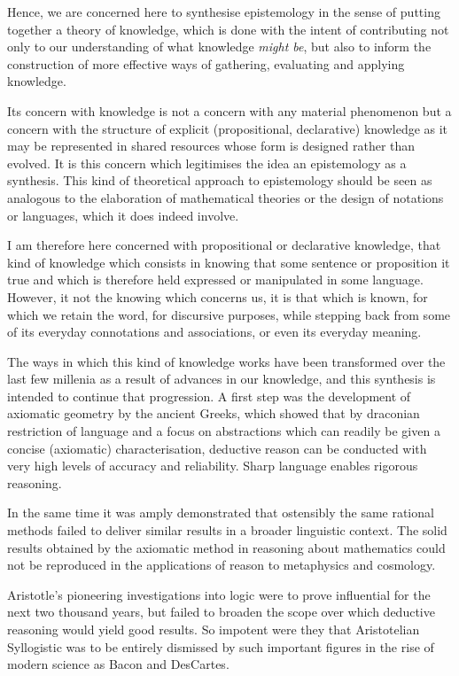\documentclass[10pt,titlepage]{book}
\begin{document}
Hence, we are concerned here to synthesise epistemology in the sense of putting together a theory of knowledge, which is done with the intent of contributing not only to our understanding of what knowledge \emph{might be}, but also to inform the construction of more effective ways of gathering, evaluating and applying knowledge.



Its concern with knowledge is not a concern with any material phenomenon but a concern with the structure of explicit (propositional, declarative) knowledge as it may be represented in shared resources whose form is designed rather than evolved.
It is this concern which legitimises the idea an epistemology as a synthesis.
This kind of theoretical approach to epistemology should be seen as analogous to the elaboration of mathematical theories or the design of notations or languages, which it does indeed involve.

I am therefore here concerned with propositional or declarative knowledge, that kind of knowledge which consists in knowing that some sentence or proposition it true and which is therefore held expressed or manipulated in some language.
However, it not the knowing which concerns us, it is that which is known, for which we retain the word, for discursive purposes, while stepping back from some of its everyday connotations and associations, or even its everyday meaning.

The ways in which this kind of knowledge works have been transformed over the last few millenia as a result of advances in our knowledge, and this synthesis is intended to continue that progression.
A first step was the development of axiomatic geometry by the ancient Greeks, which showed that by draconian restriction of language and a focus on abstractions which can readily be given a concise (axiomatic) characterisation, deductive reason can be conducted with very high levels of accuracy and reliability.
Sharp language enables rigorous reasoning.

In the same time it was amply demonstrated that ostensibly the same rational methods failed to deliver similar results in a broader linguistic context.
The solid results obtained by the axiomatic method in reasoning about mathematics could not be reproduced in the applications of reason to metaphysics and cosmology.

Aristotle's pioneering investigations into logic were to prove influential for the next two thousand years, but failed to broaden the scope over which deductive reasoning would yield good results.
So impotent were they that Aristotelian Syllogistic was to be entirely dismissed by such important figures in the rise of modern science as Bacon and DesCartes.
\end{document}

